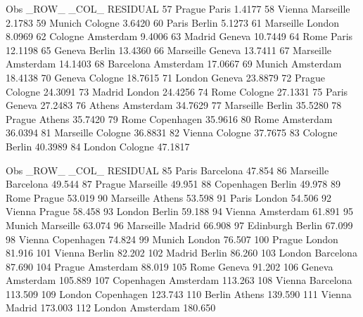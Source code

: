 \documentclass{article}
\begin{document}
\begin{Woutput}
Obs    _ROW_        _COL_         RESIDUAL
 57    Prague       Paris           1.4177
 58    Vienna       Marseille       2.1783
 59    Munich       Cologne         3.6420
 60    Paris        Berlin          5.1273
 61    Marseille    London          8.0969
 62    Cologne      Amsterdam       9.4006
 63    Madrid       Geneva         10.7449
 64    Rome         Paris          12.1198
 65    Geneva       Berlin         13.4360
 66    Marseille    Geneva         13.7411
 67    Marseille    Amsterdam      14.1403
 68    Barcelona    Amsterdam      17.0667
 69    Munich       Amsterdam      18.4138
 70    Geneva       Cologne        18.7615
 71    London       Geneva         23.8879
 72    Prague       Cologne        24.3091
 73    Madrid       London         24.4256
 74    Rome         Cologne        27.1331
 75    Paris        Geneva         27.2483
 76    Athens       Amsterdam      34.7629
 77    Marseille    Berlin         35.5280
 78    Prague       Athens         35.7420
 79    Rome         Copenhagen     35.9616
 80    Rome         Amsterdam      36.0394
 81    Marseille    Cologne        36.8831
 82    Vienna       Cologne        37.7675
 83    Cologne      Berlin         40.3989
 84    London       Cologne        47.1817

Obs    _ROW_         _COL_         RESIDUAL
 85    Paris         Barcelona       47.854
 86    Marseille     Barcelona       49.544
 87    Prague        Marseille       49.951
 88    Copenhagen    Berlin          49.978
 89    Rome          Prague          53.019
 90    Marseille     Athens          53.598
 91    Paris         London          54.506
 92    Vienna        Prague          58.458
 93    London        Berlin          59.188
 94    Vienna        Amsterdam       61.891
 95    Munich        Marseille       63.074
 96    Marseille     Madrid          66.908
 97    Edinburgh     Berlin          67.099
 98    Vienna        Copenhagen      74.824
 99    Munich        London          76.507
100    Prague        London          81.916
101    Vienna        Berlin          82.202
102    Madrid        Berlin          86.260
103    London        Barcelona       87.690
104    Prague        Amsterdam       88.019
105    Rome          Geneva          91.202
106    Geneva        Amsterdam      105.889
107    Copenhagen    Amsterdam      113.263
108    Vienna        Barcelona      113.509
109    London        Copenhagen     123.743
110    Berlin        Athens         139.590
111    Vienna        Madrid         173.003
112    London        Amsterdam      180.650


\end{Woutput}
\end{document}

